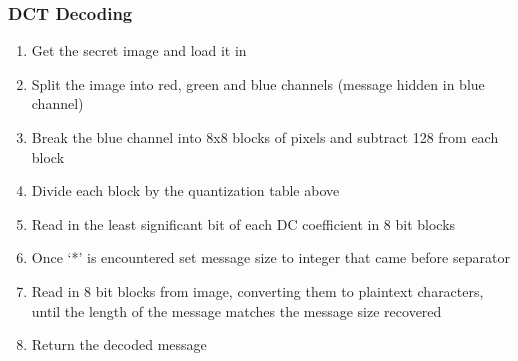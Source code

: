 \documentclass[11pt,letterpaper]{article}
\begin{document}
\subsubsection{DCT Decoding}
\begin{enumerate}
\setlength\itemsep{0pt}
\item Get the secret image and load it in
\item Split the image into red, green and blue channels (message hidden in blue channel)
\item Break the blue channel into 8x8 blocks of pixels and subtract 128 from each block
\item Divide each block by the quantization table above
\item Read in the least significant bit of each DC coefficient in 8 bit blocks
\item Once ‘*’ is encountered set message size to integer that came before separator
\item Read in 8 bit blocks from image, converting them to plaintext characters, until the length of the message matches the message size recovered
\item Return the decoded message
\end{enumerate}
\end{document}

